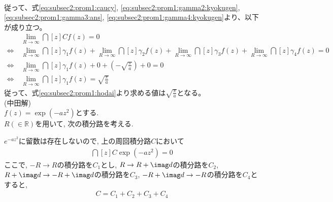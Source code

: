 \documentclass[dvipdfmx,titlepage, 11pt, a4paper]{jsarticle}%
\begin{document}
\begin{enumerate}[(1)]
\begin{align}
    \end{align}
    従って、式\eqref{eq:subsec2:prom1:caucy}, \eqref{eq:subsec2:prom1:gamma2:kyokugen}, 
    \eqref{eq:subsec2:prom1:gamma3:ans}, \eqref{eq:subsec2:prom1:gamma4:kyokugen}より、以下が成り立つ。
    \begin{align*}
        &\lim_{R \to \infty}\dint[z]{C}{}{f(z)} = 0\\
        \Longleftrightarrow\, &\lim_{R \to \infty} \dint[z]{\gamma_1}{}{f(z)} + \lim_{R \to \infty} \dint[z]{\gamma_2}{}{f(z)} + \lim_{R \to \infty} \dint[z]{\gamma_3}{}{f(z)}
         + \lim_{R \to \infty} \dint[z]{\gamma_4}{}{f(z)} = 0\\
        \Longleftrightarrow\, &\lim_{R \to \infty} \dint[z]{\gamma_1}{}{f(z)} + 0 + \left(-\sqrt{\frac{\pi}{a}}\right)
         + 0 = 0\\
        \Longleftrightarrow\, &\lim_{R \to \infty} \dint[z]{\gamma_1}{}{f(z)} = \sqrt{\frac{\pi}{a}}
    \end{align*}
    従って、式\eqref{eq:subsec2:prom1:hodai}より求める値は$\sqrt{\frac{\pi}{a}}$となる。\\[1cm]
    (中田解)\\
    $f(z)=\exp(-az^{2})$とする.\\
    $R(\in \mathbb{R})$を用いて, 次の積分路を考える.
    \begin{center}
    \end{center}
    $e^{-az^{2}}$に留数は存在しないので, 上の周回積分路$C$において
    \begin{eqnarray*}
        \dint[z]{C}{}{\exp(-az^{2})}=0 
    \end{eqnarray*}
    ここで, $-R\to R$の積分路を$C_{1}$とし, $R\to R+\imag d$の積分路を$C_{2}$, $R+\imag d\to -R+\imag d$の積分路を$C_{3}$, $-R+\imag d\to -R$の積分路を$C_{4}$とすると,
    \begin{eqnarray*}
        C = C_{1}+C_{2}+C_{3}+C_{4}

\end{eqnarray*}
\end{enumerate}
\end{document}
